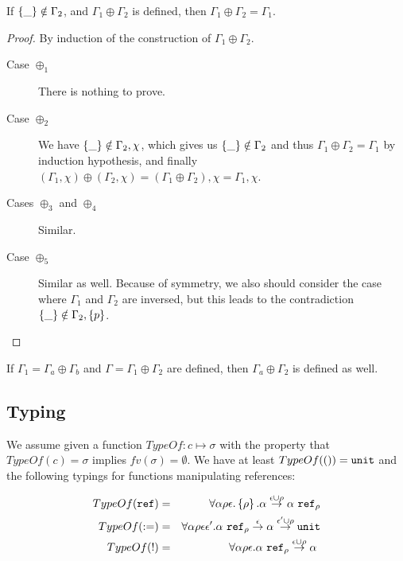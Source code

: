 \documentclass[a4paper]{article}
\newcommand{\void}{{\tt ()}}
\newcommand{\unit}{{\tt unit}}
\begin{document}
\begin{prop}
  \label{prop:oplusabsorb}
  If $\left\{ \_ \right\}\notin \Gamma_2$, and $\Gamma_1 \oplus \Gamma_2$ is defined, then $\Gamma_1
  \oplus \Gamma_2 = \Gamma_1$.
\begin{proof}
  By induction of the construction of $\Gamma_1 \oplus \Gamma_2$.
  \begin{description}
    \item[Case $\oplus_1$] There is nothing to prove.

    \item[Case $\oplus_2$] We have $\left\{ \_ \right\}\notin \Gamma_2, \chi$, which gives us
      $\left\{ \_ \right\}\notin \Gamma_2$ and thus $\Gamma_1\oplus \Gamma_2 = \Gamma_1$ by induction
      hypothesis, and finally $(\Gamma_1,\chi) \oplus (\Gamma_2,\chi) = (\Gamma_1 \oplus \Gamma_2), \chi =
      \Gamma_1, \chi$.

    \item[Cases $\oplus_3$ and $\oplus_4$] Similar.
    
    \item[Case $\oplus_5$ ] Similar as well. Because of symmetry, we also
      should consider the case where $\Gamma_1$ and $\Gamma_2$ are inversed, but this
      leads to the contradiction $\left\{ \_ \right\}\notin \Gamma_2,\left\{ p \right\}$. 
  \end{description}
\end{proof}
\end{prop}

\begin{prop}
  \label{prop:defplusplus}
  If $\Gamma_1 = \Gamma_a \oplus \Gamma_b$ and $\Gamma = \Gamma_1 \oplus \Gamma_2$ are defined, then 
  $\Gamma_a \oplus \Gamma_2$ is defined as well.
\end{prop}

\subsection{Typing}
\label{sec:typing}

We assume given a function $TypeOf : c \mapsto \sigma$ with the property that
$TypeOf(c) = \sigma$ implies $fv(\sigma) = \emptyset$. We have at least $TypeOf(\void) =
\unit$ and the following typings for functions manipulating references:

\begin{eqnarray*}
  TypeOf(\reft) & = & \forall\alpha\rho\epsilon.\regty{\rho}{\alpha\effarr{\epsilon\cup \rho} \refreg{\alpha}{\rho}} \\
  TypeOf( := ) & = & \forall\alpha\rho\epsilon\epsilon'. \refreg{\alpha}{\rho} \effarr{\epsilon} \alpha
  \effarr{\epsilon'\cup \rho} \unit \\
  TypeOf( !) & = & \forall\alpha\rho\epsilon. \refreg{\alpha}{\rho} \effarr{\epsilon\cup \rho} \alpha \\
\end{eqnarray*}
\end{document}
